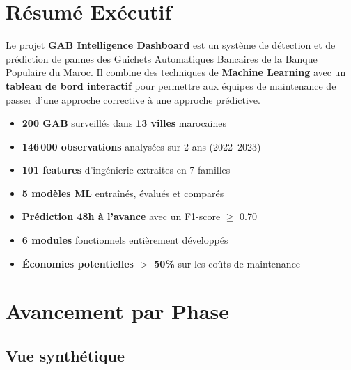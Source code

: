\documentclass[a4paper,12pt]{report}
\begin{document}
\tableofcontents
\newpage

\chapter{Résumé Exécutif}

Le projet \textbf{GAB Intelligence Dashboard} est un système de détection et de prédiction de pannes des Guichets Automatiques Bancaires de la Banque Populaire du Maroc. Il combine des techniques de \textbf{Machine Learning} avec un \textbf{tableau de bord interactif} pour permettre aux équipes de maintenance de passer d'une approche corrective à une approche prédictive.

\begin{tcolorbox}[colback=bpmgray, colframe=bpmblue, title=\textbf{Chiffres clés}]
\begin{itemize}[leftmargin=1cm]
    \item \textbf{200 GAB} surveillés dans \textbf{13 villes} marocaines
    \item \textbf{146\,000 observations} analysées sur 2 ans (2022–2023)
    \item \textbf{101 features} d'ingénierie extraites en 7 familles
    \item \textbf{5 modèles ML} entraînés, évalués et comparés
    \item \textbf{Prédiction 48h à l'avance} avec un F1-score $\geq$ 0.70
    \item \textbf{6 modules} fonctionnels entièrement développés
    \item \textbf{Économies potentielles $>$ 50\%} sur les coûts de maintenance
\end{itemize}
\end{tcolorbox}

\chapter{Avancement par Phase}

\section{Vue synthétique}
\end{document}
